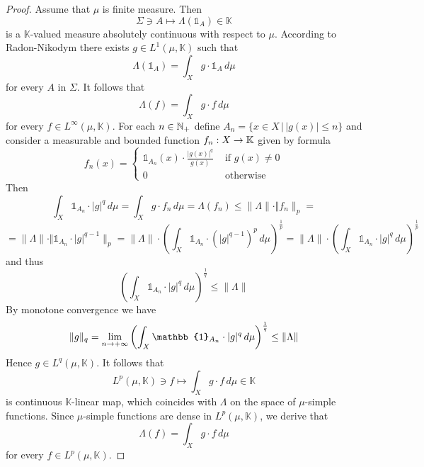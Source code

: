 \begin{proof}
  Assume that $\mu$ is finite measure. Then
  $$\Sigma \ni A \mapsto \Lambda(\mathbb{1}_A) \in \mathbb{K}$$
  is a $\mathbb{K}$-valued measure absolutely continuous with respect to $\mu$. According to Radon-Nikodym there exists $g \in L^1(\mu,\mathbb{K})$ such that
  $$\Lambda\left(\mathbb{1}_A\right) = \int_Xg\cdot \mathbb{1}_A\,d\mu$$
  for every $A$ in $\Sigma$. It follows that
  $$\Lambda(f) = \int_Xg\cdot f\,d\mu$$
  for every $f \in L^{\infty}(\mu,\mathbb{K})$. For each $n \in {\mathbb N}_+$ define $A_n = \big\{x\in X\,\big|\,|g(x)|\leq n\big\}$ and consider a measurable and bounded function $f_n:X\rightarrow \mathbb{K}$ given by formula
  $$f_n(x) = \begin{cases}
      \mathbb{1}_{A_n}(x)\cdot \frac{|g(x)|^q}{g(x)} & \mbox{ if }g(x) \neq 0 \\
      0                                              & \mbox{ otherwise }
    \end{cases}
  $$
  Then
  $$\int_X \mathbb{1}_{A_n} \cdot |g|^{q}\,d\mu = \int_X g \cdot f_n\,d\mu = \Lambda\left(f_n\right) \leq \lVert \Lambda \rVert\cdot \Vert f_n \rVert_p = $$
  $$= \lVert \Lambda \rVert\cdot \Vert \mathbb{1}_{A_n}\cdot |g|^{q-1}\rVert_p = \lVert \Lambda \rVert\cdot \left(\int_X \mathbb{1}_{A_n}\cdot\left(|g|^{q-1}\right)^p\,d\mu\right)^{\frac{1}{p}} = \lVert \Lambda \rVert\cdot \left(\int_X \mathbb{1}_{A_n}\cdot |g|^{q}\,d\mu\right)^{\frac{1}{p}}$$
  and thus
  $$\left(\int_X \mathbb{1}_{A_n} \cdot |g|^{q}\,d\mu\right)^{\frac{1}{q}} \leq \lVert \Lambda \rVert$$
  By monotone convergence we have
  $$\lVert g \rVert_q = \lim_{n\ra +\infty}\left(\int_X \mathbb{1}_{A_n} \cdot |g|^{q}\,d\mu\right)^{\frac{1}{q}} \leq \lVert \Lambda \rVert$$
  Hence $g \in L^q(\mu,\mathbb{K})$. It follows that
  $$L^p(\mu,\mathbb{K}) \ni f \mapsto \int_{X}g\cdot f\,d\mu \in \mathbb{K}$$
  is continuous $\mathbb{K}$-linear map, which coincides with $\Lambda$ on the space of $\mu$-simple functions. Since $\mu$-simple functions are dense in $L^p(\mu,\mathbb{K})$, we derive that
  $$\Lambda(f) = \int_{X}g\cdot f\,d\mu$$
  for every $f \in L^p(\mu,\mathbb{K})$. 


\end{proof}
